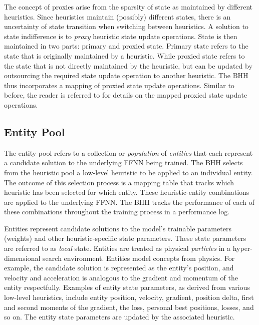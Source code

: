 The concept of proxies arise from the sparsity of state as maintained by different heuristics. Since heuristics maintain (possibly) different states, there is an uncertainty of state transition when switching between heuristics. A solution to state indifference is to \textit{proxy} heuristic state update operations. State is then maintained in two parts: primary and proxied state. Primary state refers to the state that is originally maintained by a heuristic. While proxied state refers to the state that is not directly maintained by the heuristic, but can be updated by outsourcing the required state update operation to another heuristic. The \acs{BHH} thus incorporates a mapping of proxied state update operations. Similar to before, the reader is referred to \cite{ref:schreuder:2022} for details on the mapped proxied state update operations.

\subsection{Entity Pool}\label{sec:bhh:entity_pool}

The entity pool refers to a collection or \textit{population} of \textit{entities} that each represent a candidate solution to the underlying \acs{FFNN} being trained. The \acs{BHH} selects from the heuristic pool a low-level heuristic to be applied to an individual entity. The outcome of this selection process is a mapping table that tracks which heuristic has been selected for which entity. These heuristic-entity combinations are applied to the underlying \acs{FFNN}. The \acs{BHH} tracks the performance of each of these combinations throughout the training process in a performance log.

Entities represent candidate solutions to the model's trainable parameters (weights) and other heuristic-specific state parameters. These state parameters are referred to as \textit{local} state. Entities are treated as physical \textit{particles} in a hyper-dimensional search environment. Entities model concepts from physics. For example, the candidate solution is represented as the entity's position, and velocity and acceleration is analogous to the gradient and momentum of the entity respectfully. Examples of entity state parameters, as derived from various low-level heuristics, include entity position, velocity, gradient, position delta, first and second moments of the gradient, the loss, personal best positions, losses, and so on. The entity state parameters are updated by the associated heuristic.

